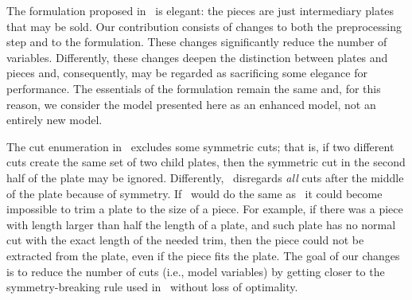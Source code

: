 \documentclass[smallextended]{svjour3}       %
\begin{document}

The formulation proposed in~\cite{furini:2016} is elegant: the pieces are just intermediary plates that may be sold.
Our contribution consists of changes to both the preprocessing step and to the formulation.
These changes significantly reduce the number of variables.
Differently, these changes deepen the distinction between plates and pieces and, consequently, may be regarded as sacrificing some elegance for performance.
The essentials of the formulation remain the same and, for this reason, we consider the model presented here as an enhanced model, not an entirely new model.


The cut enumeration in~\cite{furini:2016} excludes some symmetric cuts; that is, if two different cuts create the same set of two child plates, then the symmetric cut in the second half of the plate may be ignored.
Differently,~\cite{nicos:1977} disregards \emph{all} cuts after the middle of the plate because of symmetry.
If~\cite{furini:2016} would do the same as~\cite{nicos:1977} it could become impossible to trim a plate to the size of a piece.
For example, if there was a piece with length larger than half the length of a plate, and such plate has no normal cut with the exact length of the needed trim, then the piece could not be extracted from the plate, even if the piece fits the plate.
The goal of our changes is to reduce the number of cuts (i.e., model variables) by getting closer to the symmetry-breaking rule used in~\cite{nicos:1977} without loss of optimality.

\end{document}

